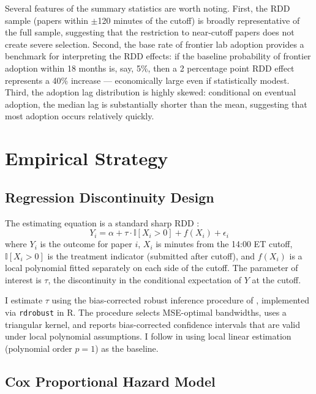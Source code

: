 \documentclass[12pt]{article}
\newcommand{\ind}{\mathbb{I}}
\begin{document}
Several features of the summary statistics are worth noting. First, the RDD sample (papers within $\pm$120 minutes of the cutoff) is broadly representative of the full sample, suggesting that the restriction to near-cutoff papers does not create severe selection. Second, the base rate of frontier lab adoption provides a benchmark for interpreting the RDD effects: if the baseline probability of frontier adoption within 18 months is, say, 5\%, then a 2 percentage point RDD effect represents a 40\% increase --- economically large even if statistically modest. Third, the adoption lag distribution is highly skewed: conditional on eventual adoption, the median lag is substantially shorter than the mean, suggesting that most adoption occurs relatively quickly.


\section{Empirical Strategy}

\subsection{Regression Discontinuity Design}

The estimating equation is a standard sharp RDD \citep{lee2010, cattaneo2020}:
\begin{equation}
    Y_i = \alpha + \tau \cdot \ind[X_i > 0] + f(X_i) + \epsilon_i
\end{equation}
where $Y_i$ is the outcome for paper $i$, $X_i$ is minutes from the 14:00 ET cutoff, $\ind[X_i > 0]$ is the treatment indicator (submitted after cutoff), and $f(X_i)$ is a local polynomial fitted separately on each side of the cutoff. The parameter of interest is $\tau$, the discontinuity in the conditional expectation of $Y$ at the cutoff.

I estimate $\tau$ using the bias-corrected robust inference procedure of \citet{calonico2014, calonico2020}, implemented via \texttt{rdrobust} in R. The procedure selects MSE-optimal bandwidths, uses a triangular kernel, and reports bias-corrected confidence intervals that are valid under local polynomial assumptions. I follow \citet{gelman2019} in using local linear estimation (polynomial order $p = 1$) as the baseline.

\subsection{Cox Proportional Hazard Model}
\end{document}
